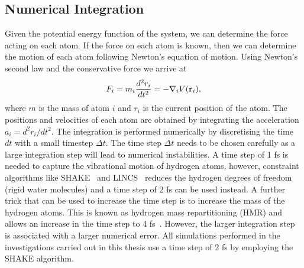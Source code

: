 \subsection{Numerical Integration}
Given the potential energy function of the system, we can determine the force acting on each 
atom. If the force on each atom is known, then we can determine the motion of each atom 
following Newton's equation of motion. Using Newton's second law and the conservative force 
we arrive at
\begin{equation}
F_{i} = m_{i}\frac{d^2 r_{i}}{dt^2} = -\nabla_{i} V({{\bf r}_{i}}),
\label{eq:newton}
\end{equation}
where $m$ is the mass of atom $i$ and $r_{i}$ is the current position of the atom. The positions 
and velocities of each atom are obtained by integrating the acceleration $a_{i} = d^2 r_{i}/dt^2$.
The integration is performed numerically by discretising the time $dt$ with a small timestep 
$\Delta t$. The time step $\Delta t$ needs to be chosen carefully as a large integration step 
will lead to numerical instabilities. A time step of 1 fs is needed to capture the vibrational 
motion of hydrogen atoms, however, constraint algorithms like SHAKE~\cite{Ryckaert1977} and 
LINCS~\cite{Hess1997} reduces the hydrogen degrees of freedom (rigid water molecules) and a 
time step of 2 fs can be used instead. A further trick that can be used to increase the time 
step is to increase the mass of the hydrogen atoms. This is known as hydrogen mass repartitioning 
(HMR) and allows an increase in the time step to 4 fs~\cite{Hopkins2015}. However, the larger 
integration step is associated with a larger numerical error. All simulations performed in the 
investigations carried out in this thesis use a time step of 2 fs by employing the SHAKE algorithm.

